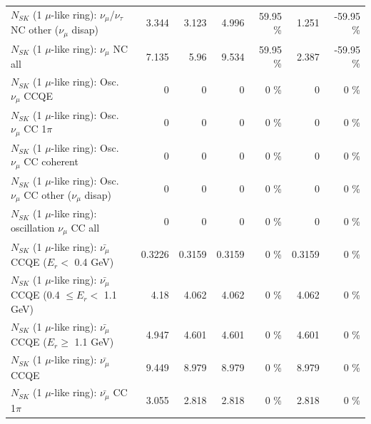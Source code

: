\begin{table}
\begin{tabular}{| l | r | r | r  r | r  r |}
   $N_{SK}$ (1 $\mu$-like ring): $\nu_\mu$/$\nu_\tau$ NC other ($\nu_\mu$ disap) &           3.344 &           3.123 &           4.996 &    59.95 \%  &           1.251 &   -59.95 \%  \\ 
                                $N_{SK}$ (1 $\mu$-like ring): $\nu_{\mu}$ NC all &           7.135 &            5.96 &           9.534 &    59.95 \%  &           2.387 &   -59.95 \%  \\ 
\hline
\hline
                               $N_{SK}$ (1 $\mu$-like ring): Osc. $\nu_\mu$ CCQE &               0 &               0 &               0 &        0 \%  &               0 &        0 \%  \\ 
                          $N_{SK}$ (1 $\mu$-like ring): Osc. $\nu_\mu$ CC 1$\pi$ &               0 &               0 &               0 &        0 \%  &               0 &        0 \%  \\ 
                        $N_{SK}$ (1 $\mu$-like ring): Osc. $\nu_\mu$ CC coherent &               0 &               0 &               0 &        0 \%  &               0 &        0 \%  \\ 
         $N_{SK}$ (1 $\mu$-like ring): Osc. $\nu_\mu$ CC other ($\nu_\mu$ disap) &               0 &               0 &               0 &        0 \%  &               0 &        0 \%  \\ 
                      $N_{SK}$ (1 $\mu$-like ring): oscillation $\nu_\mu$ CC all &               0 &               0 &               0 &        0 \%  &               0 &        0 \%  \\ 
\hline
\hline
          $N_{SK}$ (1 $\mu$-like ring): $\bar{\nu_\mu}$ CCQE ($E_{r} <$ 0.4 GeV) &          0.3226 &          0.3159 &          0.3159 &        0 \%  &          0.3159 &        0 \%  \\ 
 $N_{SK}$ (1 $\mu$-like ring): $\bar{\nu_\mu}$ CCQE (0.4 $\leq E_{r} <$ 1.1 GeV) &            4.18 &           4.062 &           4.062 &        0 \%  &           4.062 &        0 \%  \\ 
       $N_{SK}$ (1 $\mu$-like ring): $\bar{\nu_\mu}$ CCQE ($E_{r} \geq$ 1.1 GeV) &           4.947 &           4.601 &           4.601 &        0 \%  &           4.601 &        0 \%  \\ 
\hline
                              $N_{SK}$ (1 $\mu$-like ring): $\bar{\nu_\mu}$ CCQE &           9.449 &           8.979 &           8.979 &        0 \%  &           8.979 &        0 \%  \\ 
                         $N_{SK}$ (1 $\mu$-like ring): $\bar{\nu_\mu}$ CC 1$\pi$ &           3.055 &           2.818 &           2.818 &        0 \%  &           2.818 &        0 \%  \\ 

\end{tabular}
\end{table}

